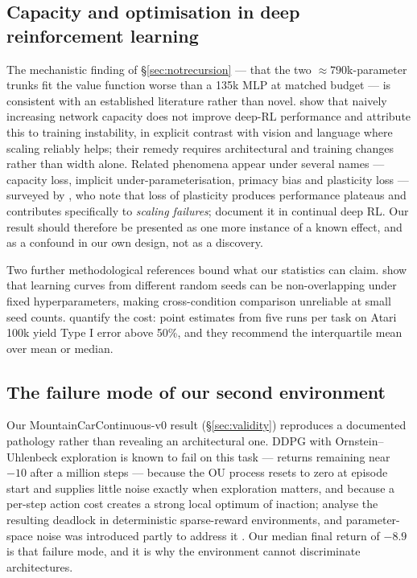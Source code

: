 \documentclass[11pt]{article}
\begin{document}
\subsection{Capacity and optimisation in deep reinforcement learning}
\label{sec:capacitylit}

The mechanistic finding of \S\ref{sec:notrecursion} --- that the two ${\approx}790$k-parameter trunks fit the value function worse than a 135k MLP at matched budget --- is consistent with an established literature rather than novel. \citet{ota2021larger} show that naively increasing network capacity does not improve deep-RL performance and attribute this to training instability, in explicit contrast with vision and language where scaling reliably helps; their remedy requires architectural and training changes rather than width alone. Related phenomena appear under several names --- capacity loss, implicit under-parameterisation, primacy bias and plasticity loss --- surveyed by \citet{klein2024plasticity}, who note that loss of plasticity produces performance plateaus and contributes specifically to \emph{scaling failures}; \citet{abbas2023plasticity} document it in continual deep RL. Our result should therefore be presented as one more instance of a known effect, and as a confound in our own design, not as a discovery.

Two further methodological references bound what our statistics can claim. \citet{henderson2018matters} show that learning curves from different random seeds can be non-overlapping under fixed hyperparameters, making cross-condition comparison unreliable at small seed counts. \citet{agarwal2021precipice} quantify the cost: point estimates from five runs per task on Atari 100k yield Type I error above 50\%, and they recommend the interquartile mean over mean or median.

\subsection{The failure mode of our second environment}
\label{sec:mccfailure}

Our MountainCarContinuous-v0 result (\S\ref{sec:validity}) reproduces a documented pathology rather than revealing an architectural one. DDPG with Ornstein--Uhlenbeck exploration is known to fail on this task --- returns remaining near $-10$ after a million steps --- because the OU process resets to zero at episode start and supplies little noise exactly when exploration matters, and because a per-step action cost creates a strong local optimum of inaction; \citet{matheron2019ddpg} analyse the resulting deadlock in deterministic sparse-reward environments, and parameter-space noise was introduced partly to address it \citep{plappert2018paramnoise}. Our median final return of $-8.9$ is that failure mode, and it is why the environment cannot discriminate architectures.
\end{document}
